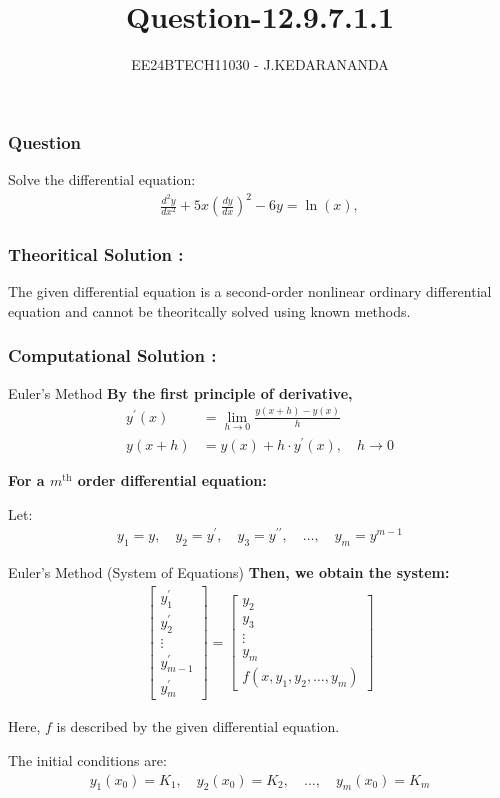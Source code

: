 \documentclass{beamer}
\title{Question-12.9.7.1.1}
\author{EE24BTECH11030 - J.KEDARANANDA}
\date{}
\begin{document}
\frame{\titlepage}

\begin{frame}
\frametitle{Question}
Solve the differential equation:
\begin{align}
    \frac{d^2y}{dx^2} + 5x \left( \frac{dy}{dx} \right)^2 - 6y = \ln(x),
\end{align}
\end{frame}

\begin{frame}
\frametitle{Theoritical Solution : }

\centering
The given differential equation is a second-order nonlinear ordinary differential equation
and cannot be theoritcally solved using known methods.
\end{frame}

\begin{frame}
\frametitle{Computational Solution : }
Euler's Method
\textbf{By the first principle of derivative,}
\begin{align}
    y^{\prime}(x) &= \lim_{h\to0} \frac{y(x + h) - y(x)}{h}\\
    y(x + h) &= y(x) + h \cdot y^{\prime}(x), \quad h\to0
\end{align}

\textbf{For a $m^{\text{th}}$ order differential equation:}

\medskip

Let:
\begin{align}
    y_1 = y, \quad y_2 = y^{\prime}, \quad y_3 = y^{\prime\prime}, \quad \dots, \quad y_m = y^{m - 1}
\end{align}
\end{frame}
\begin{frame}{Euler's Method (System of Equations)}
\textbf{Then, we obtain the system:}
\begin{align}
    \begin{bmatrix}
        y_1^{\prime} \\ 
        y_2^{\prime} \\ 
        \vdots \\ 
        y_{m - 1}^{\prime} \\ 
        y_m^{\prime}
    \end{bmatrix}
    =
    \begin{bmatrix}
        y_2 \\ 
        y_3 \\ 
        \vdots \\ 
        y_m \\ 
        f(x, y_1, y_2, \dots, y_m)
    \end{bmatrix}
\end{align}

Here, $f$ is described by the given differential equation.

\medskip

The initial conditions are:
\begin{align*}
    y_1(x_0) = K_1, \quad 
    y_2(x_0) = K_2, \quad 
    \dots, \quad 
    y_m(x_0) = K_m
\end{align*}
\end{frame}
\end{document}
